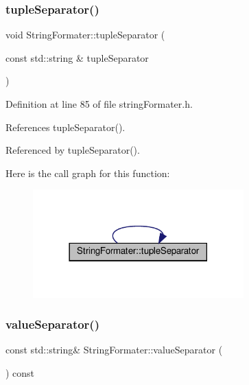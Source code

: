 \subsubsection{\texorpdfstring{tuple\+Separator()}{tupleSeparator()}\hspace{0.1cm}{\footnotesize\ttfamily [2/2]}}
{\footnotesize\ttfamily void String\+Formater\+::tuple\+Separator (\begin{DoxyParamCaption}\item[{const std\+::string \&}]{tuple\+Separator }\end{DoxyParamCaption})\hspace{0.3cm}{\ttfamily [inline]}}



Definition at line 85 of file string\+Formater.\+h.



References tuple\+Separator().



Referenced by tuple\+Separator().

Here is the call graph for this function\+:
\nopagebreak
\begin{figure}[H]
\begin{center}
\leavevmode
\includegraphics[width=230pt]{classStringFormater_a20c69db03bbd7bfff3154b560ff0106b_cgraph}
\end{center}
\end{figure}
\mbox{\label{classStringFormater_a63ed3fb057158b3e96333f5d6761400a}} 
\subsubsection{\texorpdfstring{value\+Separator()}{valueSeparator()}\hspace{0.1cm}{\footnotesize\ttfamily [1/2]}}
{\footnotesize\ttfamily const std\+::string\& String\+Formater\+::value\+Separator (\begin{DoxyParamCaption}{ }\end{DoxyParamCaption}) const\hspace{0.3cm}{\ttfamily [inline]}}



